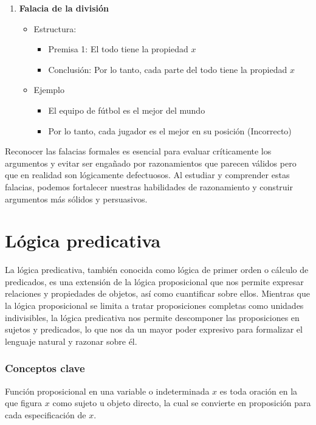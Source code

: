 \begin{enumerate}
	\item \textbf{Falacia de la división}
	\begin{itemize}
		\item Estructura:
		\begin{itemize}[itemsep=-5pt]
			\item Premisa 1: El todo tiene la propiedad $x$
			\item Conclusión: Por lo tanto, cada parte del todo tiene la propiedad $x$
		\end{itemize}
		\item Ejemplo
		\begin{itemize}[itemsep=-5pt]
			\item El equipo de fútbol es el mejor del mundo
			\item Por lo tanto, cada jugador es el mejor en su posición (Incorrecto)
		\end{itemize}
	\end{itemize}
\end{enumerate}

Reconocer las falacias formales es esencial para evaluar críticamente los argumentos y evitar ser engañado por razonamientos que parecen válidos pero que en realidad son lógicamente defectuosos. Al estudiar y comprender estas falacias, podemos fortalecer nuestras habilidades de razonamiento y construir argumentos más sólidos y persuasivos.


\section{Lógica predicativa}

La lógica predicativa, también conocida como lógica de primer orden o cálculo de predicados, es una extensión de la lógica proposicional que nos permite expresar relaciones y propiedades de objetos, así como cuantificar sobre ellos. Mientras que la lógica proposicional se limita a tratar proposiciones completas como unidades indivisibles, la lógica predicativa nos permite descomponer las proposiciones en sujetos y predicados, lo que nos da un mayor poder expresivo para formalizar el lenguaje natural y razonar sobre él.


\subsubsection{Conceptos clave}
\vspace{1em}
\begin{fmd-definition}
	Función proposicional en una variable o indeterminada $x$ es toda oración en la que figura $x$ como sujeto u objeto directo, la cual se convierte en proposición para cada especificación de $x$.
\end{fmd-definition}

